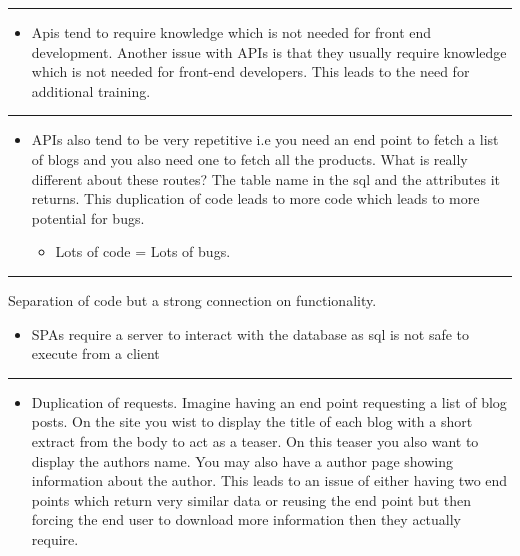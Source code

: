 \documentclass[
  12pt,
]{article}
\providecommand{\tightlist}{%
  \setlength{\itemsep}{0pt}\setlength{\parskip}{0pt}}
\begin{document}
\begin{center}\rule{0.5\linewidth}{\linethickness}\end{center}

\begin{itemize}
\tightlist
\item
  Apis tend to require knowledge which is not needed for front end
  development. Another issue with APIs is that they usually require
  knowledge which is not needed for front-end developers. This leads to
  the need for additional training.
\end{itemize}

\begin{center}\rule{0.5\linewidth}{\linethickness}\end{center}

\begin{itemize}
\tightlist
\item
  APIs also tend to be very repetitive i.e you need an end point to
  fetch a list of blogs and you also need one to fetch all the products.
  What is really different about these routes? The table name in the sql
  and the attributes it returns. This duplication of code leads to more
  code which leads to more potential for bugs.

  \begin{itemize}
  \tightlist
  \item
    Lots of code = Lots of bugs.
  \end{itemize}
\end{itemize}

\begin{center}\rule{0.5\linewidth}{\linethickness}\end{center}

Separation of code but a strong connection on functionality.

\begin{itemize}
\tightlist
\item
  SPAs require a server to interact with the database as sql is not safe
  to execute from a client
\end{itemize}

\begin{center}\rule{0.5\linewidth}{\linethickness}\end{center}

\begin{itemize}
\tightlist
\item
  Duplication of requests. Imagine having an end point requesting a list
  of blog posts. On the site you wist to display the title of each blog
  with a short extract from the body to act as a teaser. On this teaser
  you also want to display the authors name. You may also have a author
  page showing information about the author. This leads to an issue of
  either having two end points which return very similar data or reusing
  the end point but then forcing the end user to download more
  information then they actually require.
\end{itemize}
\end{document}
